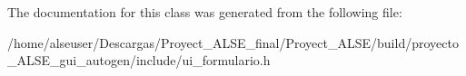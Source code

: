 The documentation for this class was generated from the following file\+:\begin{DoxyCompactItemize}
\item 
/home/alseuser/\+Descargas/\+Proyect\+\_\+\+A\+L\+S\+E\+\_\+final/\+Proyect\+\_\+\+A\+L\+S\+E/build/proyecto\+\_\+\+A\+L\+S\+E\+\_\+gui\+\_\+autogen/include/ui\+\_\+formulario.\+h\end{DoxyCompactItemize}
